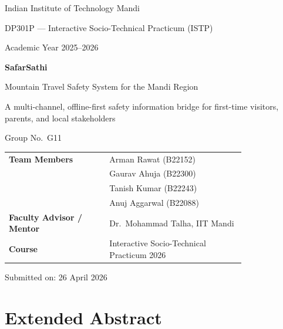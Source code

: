 \documentclass[12pt,a4paper]{article}
\begin{document}
\begin{titlepage}
  \centering
  \vspace*{0.5cm}
  {\Large Indian Institute of Technology Mandi\par}
  \vspace{0.25cm}
  {\large DP301P --- Interactive Socio-Technical Practicum (ISTP)\par}
  {\large Academic Year 2025--2026\par}
  \vspace{1.5cm}
  {\Huge\bfseries SafarSathi\par}
  \vspace{0.35cm}
  {\Large Mountain Travel Safety System for the Mandi Region\par}
  \vspace{0.35cm}
  {\large A multi-channel, offline-first safety information bridge for first-time visitors, parents, and local stakeholders\par}
  \vspace{1.2cm}
  {\large Group No.\ G11\par}
  \vspace{0.9cm}
  \begin{tabular}{>{\bfseries}p{0.34\linewidth}p{0.46\linewidth}}
    Team Members & Arman Rawat \hfill (B22152)\\
                 & Gaurav Ahuja \hfill (B22300)\\
                 & Tanish Kumar \hfill (B22243)\\
                 & Anuj Aggarwal \hfill (B22088)\\[0.5cm]
    Faculty Advisor / Mentor & Dr.\ Mohammad Talha, IIT Mandi\\
    Course & Interactive Socio-Technical Practicum 2026\\
  \end{tabular}
  \vfill
  {\large Submitted on: 26 April 2026\par}
\end{titlepage}

\tableofcontents
\newpage
\listoffigures
\listoftables
\newpage
{}

\section*{Extended Abstract}
\end{document}
